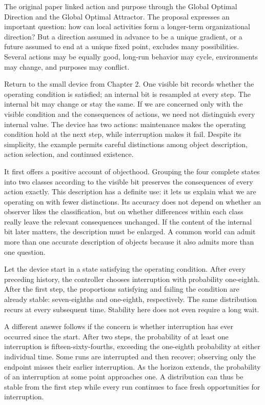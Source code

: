 \documentclass[
  english,
  11pt,
  oneside]{book}
\begin{document}
The original paper linked action and purpose through the Global Optimal Direction and the Global Optimal Attractor. The proposal expresses an important question: how can local activities form a longer-term organizational direction? But a direction assumed in advance to be a unique gradient, or a future assumed to end at a unique fixed point, excludes many possibilities. Several actions may be equally good, long-run behavior may cycle, environments may change, and purposes may conflict.

Return to the small device from Chapter 2. One visible bit records whether the operating condition is satisfied; an internal bit is resampled at every step. The internal bit may change or stay the same. If we are concerned only with the visible condition and the consequences of actions, we need not distinguish every internal value. The device has two actions: maintenance makes the operating condition hold at the next step, while interruption makes it fail. Despite its simplicity, the example permits careful distinctions among object description, action selection, and continued existence.

It first offers a positive account of objecthood. Grouping the four complete states into two classes according to the visible bit preserves the consequences of every action exactly. This description has a definite use: it lets us explain what we are operating on with fewer distinctions. Its accuracy does not depend on whether an observer likes the classification, but on whether differences within each class really leave the relevant consequences unchanged. If the content of the internal bit later matters, the description must be enlarged. A common world can admit more than one accurate description of objects because it also admits more than one question.

Let the device start in a state satisfying the operating condition. After every preceding history, the controller chooses interruption with probability one-eighth. After the first step, the proportions satisfying and failing the condition are already stable: seven-eighths and one-eighth, respectively. The same distribution recurs at every subsequent time. Stability here does not even require a long wait.

A different answer follows if the concern is whether interruption has ever occurred since the start. After two steps, the probability of at least one interruption is fifteen-sixty-fourths, exceeding the one-eighth probability at either individual time. Some runs are interrupted and then recover; observing only the endpoint misses their earlier interruption. As the horizon extends, the probability of an interruption at some point approaches one. A distribution can thus be stable from the first step while every run continues to face fresh opportunities for interruption.
\end{document}
